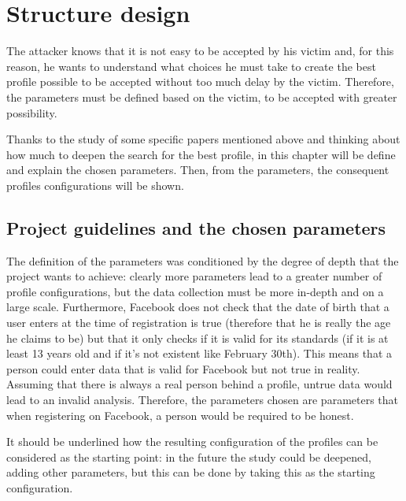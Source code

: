 
\chapter{Structure design}
\label{cap:structure-design}

The attacker knows that it is not easy to be accepted by his victim and, for this reason, he wants to understand what choices he must take to create the best profile possible to be accepted without too much delay by the victim. Therefore, the parameters must be defined based on the victim, to be accepted with greater possibility.
\par \noindent Thanks to the study of some specific papers mentioned above and thinking about how much to deepen the search for the best profile, in this chapter will be define and explain the chosen parameters. Then, from the parameters, the consequent profiles configurations will be shown.

\section{Project guidelines and the chosen parameters}
The definition of the parameters was conditioned by the degree of depth that the project wants to achieve: clearly more parameters lead to a greater number of profile configurations, but the data collection must be more in-depth and on a large scale. Furthermore, Facebook does not check that the date of birth that a user enters at the time of registration is true (therefore that he is really the age he claims to be) but that it only checks if it is valid for its standards (if it is at least 13 years old and if it's not existent like February 30th). This means that a person could enter data that is valid for Facebook but not true in reality. Assuming that there is always a real person behind a profile, untrue data would lead to an invalid analysis. Therefore, the parameters chosen are parameters that when registering on Facebook, a person would be required to be honest.\par \noindent 
It should be underlined how the resulting configuration of the profiles can be considered as the starting point: in the future the study could be deepened, adding other parameters, but this can be done by taking this as the starting configuration.

